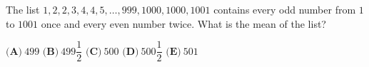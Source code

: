 The list $1,2,2,3,4,4,5,\dots,999,1000,1000,1001$ contains every odd number from $1$ to $1001$ once and every even number twice. What is the mean of the list?

$\textbf{(A)}\ 499$ \qquad $\textbf{(B)}\ 499\dfrac12$ \qquad $\textbf{(C)}\ 500$ \qquad $\textbf{(D)}\ 500\dfrac12$ \qquad $\textbf{(E)}\ 501$
